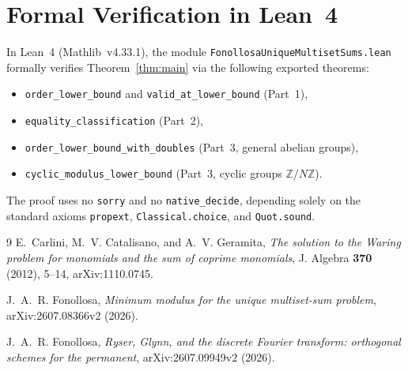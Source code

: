 \documentclass[11pt]{article}
\begin{document}
\section{Formal Verification in Lean~4}
In Lean~4 (Mathlib~v4.33.1), the module \texttt{FonollosaUniqueMultisetSums.lean} formally verifies Theorem~\ref{thm:main} via the following exported theorems:
\begin{itemize}
\item \texttt{order\_lower\_bound} and \texttt{valid\_at\_lower\_bound} (Part~1),
\item \texttt{equality\_classification} (Part~2),
\item \texttt{order\_lower\_bound\_with\_doubles} (Part~3, general abelian groups),
\item \texttt{cyclic\_modulus\_lower\_bound} (Part~3, cyclic groups $\mathbb{Z}/N\mathbb{Z}$).
\end{itemize}
The proof uses no \texttt{sorry} and no \texttt{native\_decide}, depending solely on the standard axioms \texttt{propext}, \texttt{Classical.choice}, and \texttt{Quot.sound}.

\begin{thebibliography}{9}
E.~Carlini, M.~V. Catalisano, and A.~V. Geramita, \emph{The solution to the Waring problem for monomials and the sum of coprime monomials}, J. Algebra \textbf{370} (2012), 5--14, arXiv:1110.0745.

J.~A.~R. Fonollosa, \emph{Minimum modulus for the unique multiset-sum problem}, arXiv:2607.08366v2 (2026).

J.~A.~R. Fonollosa, \emph{Ryser, Glynn, and the discrete Fourier transform: orthogonal schemes for the permanent}, arXiv:2607.09949v2 (2026).
\end{thebibliography}
\end{document}
